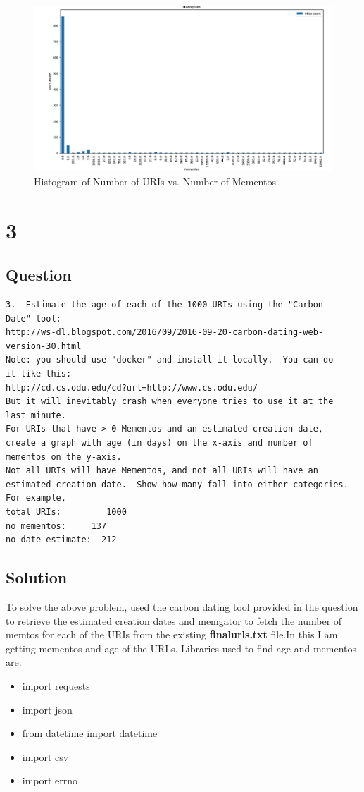 \documentclass[letterpaper,11pt]{article}
\begin{document}
\begin{figure}[h]
\centering
\includegraphics[scale=1.0]{histogramBarGraphImg.png}
\caption{Histogram of Number of URIs vs. Number of Mementos}
\label{fig:q2histogram}
\end{figure}
\clearpage
\section*{3}
\subsection*{Question}
\begin{verbatim}
3.  Estimate the age of each of the 1000 URIs using the "Carbon
Date" tool:
http://ws-dl.blogspot.com/2016/09/2016-09-20-carbon-dating-web-version-30.html
Note: you should use "docker" and install it locally.  You can do
it like this:
http://cd.cs.odu.edu/cd?url=http://www.cs.odu.edu/
But it will inevitably crash when everyone tries to use it at the
last minute.
For URIs that have > 0 Mementos and an estimated creation date,
create a graph with age (in days) on the x-axis and number of
mementos on the y-axis.
Not all URIs will have Mementos, and not all URIs will have an
estimated creation date.  Show how many fall into either categories.
For example,
total URIs:         1000
no mementos:     137  
no date estimate:  212
\end{verbatim}
\clearpage
\subsection*{Solution}
To solve the above problem, used the carbon dating tool \cite{carbondateref} provided in the question to retrieve the estimated creation dates and memgator to fetch the number of memtos for each of the URIs from the existing  \textbf{finalurls.txt} file.In this I am getting mementos and age of the URLs.
Libraries used to find age and mementos are:
\begin{itemize}
  \item import requests
  \item import json
  \item from datetime import datetime
  \item import csv
   \item import errno
\end{itemize}  
\end{document}

